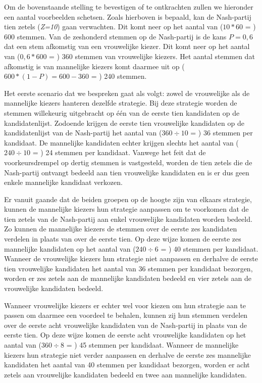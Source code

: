 Om de bovenstaande stelling te bevestigen of te ontkrachten zullen we hieronder een aantal voorbeelden schetsen. Zoals hierboven is bepaald, kan de Nash-partij tien zetels (\textit{Z=10}) gaan verwachten. Dit komt neer op het aantal van ($10*60$ = ) 600 stemmen. Van de zeshonderd stemmen op de Nash-partij is de kans $P=0,6$ dat een stem afkomstig van een vrouwelijke kiezer. Dit komt neer op het aantal van ($0,6*600$ = ) 360 stemmen van vrouwelijke kiezers. Het aantal stemmen dat afkomstig is van mannelijke kiezers komt daarmee uit op ($600*(1-P)=600-360$ = ) 240 stemmen.

Het eerste scenario dat we bespreken gaat als volgt: zowel de vrouwelijke als de mannelijke kiezers hanteren dezelfde strategie. Bij deze strategie worden de stemmen willekeurig uitgebracht op één van de eerste tien kandidaten op de kandidatenlijst. Zodoende krijgen de eerste tien vrouwelijke kandidaten op de kandidatenlijst van de Nash-partij het aantal van ($360\div10$ = ) 36 stemmen per kandidaat. De mannelijke kandidaten echter krijgen slechts het aantal van ($240\div10$ = ) 24 stemmen per kandidaat. Vanwege het feit dat de voorkeursdrempel op dertig stemmen is vastgesteld, worden de tien zetels die de Nash-partij ontvangt bedeeld aan tien vrouwelijke kandidaten en is er dus geen enkele mannelijke kandidaat verkozen.

Er vanuit gaande dat de beiden groepen op de hoogte zijn van elkaars strategie, kunnen de mannelijke kiezers hun strategie aanpassen om te voorkomen dat de tien zetels van de Nash-partij aan enkel vrouwelijke kandidaten worden bedeeld. Zo kunnen de mannelijke kiezers de stemmen over de eerste zes kandidaten verdelen in plaats van over de eerste tien. Op deze wijze komen de eerste zes mannelijke kandidaten op het aantal van ($240\div6$ = ) 40 stemmen per kandidaat. Wanneer de vrouwelijke kiezers hun strategie niet aanpassen en derhalve de eerste tien vrouwelijke kandidaten het aantal van 36 stemmen per kandidaat bezorgen, worden er zes zetels aan de mannelijke kandidaten bedeeld en vier zetels aan de vrouwelijke kandidaten bedeeld. 

Wanneer vrouwelijke kiezers er echter wel voor kiezen om hun strategie aan te passen om daarmee een voordeel te behalen, kunnen zij hun stemmen verdelen over de eerste acht vrouwelijke kandidaten van de Nash-partij in plaats van de eerste tien. Op deze wijze komen de eerste acht vrouwelijke kandidaten op het aantal van ($360\div8$ = ) 45 stemmen per kandidaat. Wanneer de mannelijke kiezers hun strategie niet verder aanpassen en derhalve de eerste zes mannelijke kandidaten het aantal van 40 stemmen per kandidaat bezorgen, worden er acht zetels aan vrouwelijke kandidaten bedeeld en twee aan mannelijke kandidaten. 

